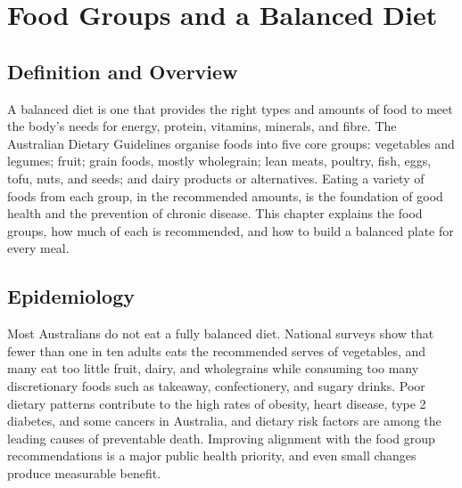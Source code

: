 \chapter{Food Groups and a Balanced Diet}

\section*{Definition and Overview}
A balanced diet is one that provides the right types and amounts of food to meet the body's needs for energy, protein, vitamins, minerals, and fibre. The Australian Dietary Guidelines organise foods into five core groups: vegetables and legumes; fruit; grain foods, mostly wholegrain; lean meats, poultry, fish, eggs, tofu, nuts, and seeds; and dairy products or alternatives. Eating a variety of foods from each group, in the recommended amounts, is the foundation of good health and the prevention of chronic disease. This chapter explains the food groups, how much of each is recommended, and how to build a balanced plate for every meal.

\section*{Epidemiology}
Most Australians do not eat a fully balanced diet. National surveys show that fewer than one in ten adults eats the recommended serves of vegetables, and many eat too little fruit, dairy, and wholegrains while consuming too many discretionary foods such as takeaway, confectionery, and sugary drinks. Poor dietary patterns contribute to the high rates of obesity, heart disease, type 2 diabetes, and some cancers in Australia, and dietary risk factors are among the leading causes of preventable death. Improving alignment with the food group recommendations is a major public health priority, and even small changes produce measurable benefit.

